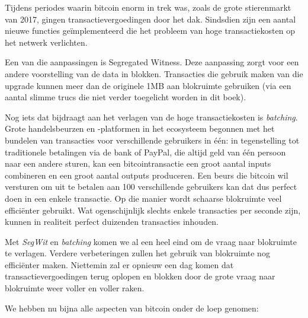 \documentclass[smalldemyvopaper,11pt,twoside,onecolumn,openright,extrafontsizes]{memoir}
\begin{document}
Tijdens periodes waarin bitcoin enorm in trek was, zoals de grote stierenmarkt van 2017, gingen transactievergoedingen door het dak. Sindsdien zijn een aantal nieuwe functies geïmplementeerd die het probleem van hoge transactiekosten op het netwerk verlichten.

Een van die aanpassingen is \textquotedbl{}Segregated Witness\textquotedbl{}. Deze aanpassing zorgt voor een andere voorstelling van de data in blokken. Transacties die gebruik maken van die upgrade kunnen meer dan de originele 1MB aan blokruimte gebruiken (via een aantal slimme trucs die niet verder toegelicht worden in dit boek).

Nog iets dat bijdraagt aan het verlagen van de hoge transactiekosten is \textit{batching}. Grote handelsbeurzen en -platformen in het ecosysteem begonnen met het bundelen van transacties voor verschillende gebruikers in één: in tegenstelling tot traditionele betalingen via de bank of PayPal, die altijd geld van één persoon naar een andere sturen, kan een bitcointransactie een groot aantal inputs combineren en een groot aantal outputs produceren. Een beurs die bitcoin wil versturen om uit te betalen aan 100 verschillende gebruikers kan dat dus perfect doen in een enkele transactie. Op die manier wordt schaarse blokruimte veel efficiënter gebruikt. Wat ogenschijnlijk slechts enkele transacties per seconde zijn, kunnen in realiteit perfect duizenden transacties inhouden.

Met \textit{SegWit} en \textit{batching} komen we al een heel eind om de vraag naar blokruimte te verlagen. Verdere verbeteringen zullen het gebruik van blokruimte nog efficiënter maken. Niettemin zal er opnieuw een dag komen dat transactievergoedingen terug oplopen en blokken door de grote vraag naar blokruimte weer voller en voller raken.

We hebben nu bijna alle aspecten van bitcoin onder de loep genomen:
\end{document}
